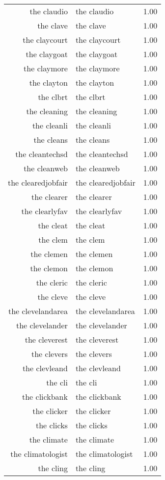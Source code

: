 \begin{table}[ht]
\begin{tabular}{rlr}
  the claudio & the claudio & 1.00 \\ 
  the clave & the clave & 1.00 \\ 
  the claycourt & the claycourt & 1.00 \\ 
  the claygoat & the claygoat & 1.00 \\ 
  the claymore & the claymore & 1.00 \\ 
  the clayton & the clayton & 1.00 \\ 
  the clbrt & the clbrt & 1.00 \\ 
  the cleaning & the cleaning & 1.00 \\ 
  the cleanli & the cleanli & 1.00 \\ 
  the cleans & the cleans & 1.00 \\ 
  the cleantechsd & the cleantechsd & 1.00 \\ 
  the cleanweb & the cleanweb & 1.00 \\ 
  the clearedjobfair & the clearedjobfair & 1.00 \\ 
  the clearer & the clearer & 1.00 \\ 
  the clearlyfav & the clearlyfav & 1.00 \\ 
  the cleat & the cleat & 1.00 \\ 
  the clem & the clem & 1.00 \\ 
  the clemen & the clemen & 1.00 \\ 
  the clemon & the clemon & 1.00 \\ 
  the cleric & the cleric & 1.00 \\ 
  the cleve & the cleve & 1.00 \\ 
  the clevelandarea & the clevelandarea & 1.00 \\ 
  the clevelander & the clevelander & 1.00 \\ 
  the cleverest & the cleverest & 1.00 \\ 
  the clevers & the clevers & 1.00 \\ 
  the clevleand & the clevleand & 1.00 \\ 
  the cli & the cli & 1.00 \\ 
  the clickbank & the clickbank & 1.00 \\ 
  the clicker & the clicker & 1.00 \\ 
  the clicks & the clicks & 1.00 \\ 
  the climate & the climate & 1.00 \\ 
  the climatologist & the climatologist & 1.00 \\ 
  the cling & the cling & 1.00 \\ 

\end{tabular}
\end{table}
